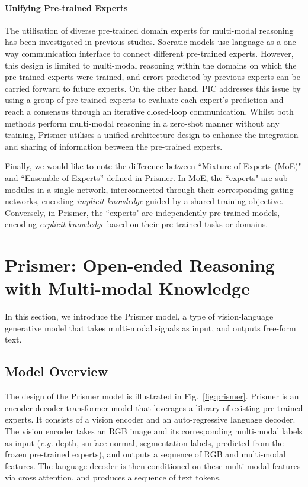 \documentclass[11pt]{article}
\begin{document}
\paragraph{Unifying Pre-trained Experts} The utilisation of diverse pre-trained domain experts for multi-modal reasoning has been investigated in previous studies. Socratic models \cite{zeng2022socratic} use language as a one-way communication interface to connect different pre-trained experts. However, this design is limited to multi-modal reasoning within the domains on which the pre-trained experts were trained, and errors predicted by previous experts can be carried forward to future experts. On the other hand, PIC \cite{li2022pic} addresses this issue by using a group of pre-trained experts to evaluate each expert's prediction and reach a consensus through an iterative closed-loop communication.  Whilst both methods perform multi-modal reasoning in a zero-shot manner without any training, Prismer utilises a unified architecture design to enhance the integration and sharing of information between the pre-trained experts.

Finally, we would like to note the difference between ``Mixture of Experts (MoE)" \cite{riquelme2021scaling,nguyen2018practical,masoudnia2014mixture} and ``Ensemble of Experts'' defined in Prismer. In MoE, the ``experts" are sub-modules in a single network, interconnected through their corresponding gating networks, encoding {\it implicit knowledge} guided by a shared training objective. Conversely, in Prismer, the ``experts" are independently pre-trained models, encoding {\it explicit knowledge} based on their pre-trained tasks or domains.



\section{Prismer: Open-ended Reasoning with Multi-modal Knowledge}
In this section, we introduce the Prismer model, a type of vision-language generative model that takes multi-modal signals as input, and outputs free-form text.


\subsection{Model Overview}
The design of the Prismer model is illustrated in Fig.~\ref{fig:prismer}.  Prismer is an encoder-decoder transformer model \cite{vaswani2017transformer} that leverages a library of existing pre-trained experts. It consists of a vision encoder and an auto-regressive language decoder. The vision encoder takes an RGB image and its corresponding multi-modal labels as input ({\it e.g.} depth, surface normal, segmentation labels, predicted from the frozen pre-trained experts), and outputs a sequence of RGB and multi-modal features. The language decoder is then conditioned on these multi-modal features via cross attention, and produces a sequence of text tokens.
\end{document}
